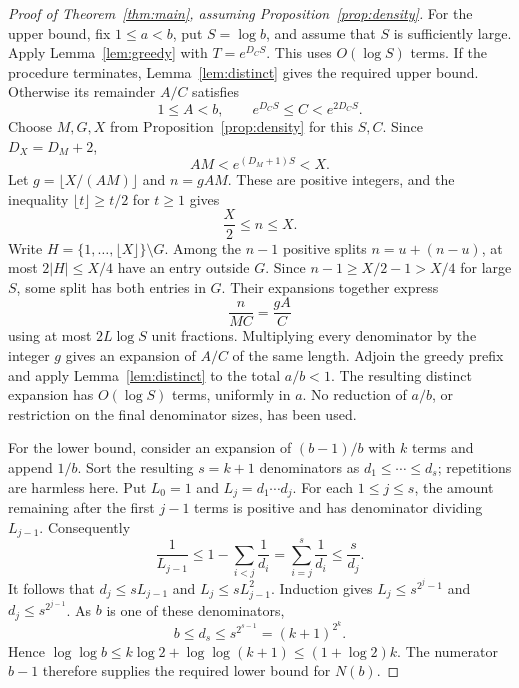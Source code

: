 \begin{proof}[Proof of Theorem~\ref{thm:main}, assuming
Proposition~\ref{prop:density}]
For the upper bound, fix \(1\le a<b\), put \(S=\log b\), and assume that
\(S\) is sufficiently large.  Apply Lemma~\ref{lem:greedy} with
\(T=e^{D_CS}\).  This uses \(O(\log S)\) terms.  If the procedure
terminates, Lemma~\ref{lem:distinct} gives the required upper bound.
Otherwise its
remainder \(A/C\) satisfies
\[
 1\le A<b,\qquad e^{D_CS}\le C<e^{2D_CS}.
\]
Choose \(M,G,X\) from Proposition~\ref{prop:density} for this \(S,C\).
Since \(D_X=D_M+2\),
\[
 AM<e^{(D_M+1)S}<X.
\]
Let \(g=\lfloor X/(AM)\rfloor\) and \(n=gAM\).  These are positive
integers, and the inequality \(\lfloor t\rfloor\ge t/2\) for \(t\ge1\)
gives
\[
 \frac X2\le n\le X.
\]
Write \(H=\{1,\ldots,\lfloor X\rfloor\}\setminus G\).
Among the \(n-1\) positive splits \(n=u+(n-u)\), at most \(2|H|\le X/4\)
have an entry outside \(G\).  Since \(n-1\ge X/2-1>X/4\) for large \(S\),
some split has both entries in \(G\).
Their expansions together express
\[
 \frac{n}{MC}=\frac{gA}{C}
\]
using at most \(2L\log S\) unit fractions.  Multiplying every denominator
by the integer \(g\) gives an expansion of \(A/C\) of the same length.
Adjoin the greedy prefix and apply Lemma~\ref{lem:distinct} to the total
\(a/b<1\).  The resulting distinct expansion has \(O(\log S)\) terms,
uniformly in \(a\).  No reduction of \(a/b\), or restriction on the final
denominator sizes, has been used.

For the lower bound, consider an expansion of \((b-1)/b\) with \(k\)
terms and append \(1/b\).  Sort the resulting \(s=k+1\) denominators as
\(d_1\le\cdots\le d_s\); repetitions are harmless here.
Put \(L_0=1\) and \(L_j=d_1\cdots d_j\).
For each \(1\le j\le s\), the amount remaining after the first \(j-1\)
terms is positive and has denominator dividing \(L_{j-1}\).
Consequently
\[
 \frac1{L_{j-1}}
 \le 1-\sum_{i<j}\frac1{d_i}
 =\sum_{i=j}^s\frac1{d_i}
 \le\frac{s}{d_j}.
\]
It follows that \(d_j\le sL_{j-1}\) and \(L_j\le sL_{j-1}^2\).
Induction gives \(L_j\le s^{2^j-1}\) and \(d_j\le s^{2^{j-1}}\).
As \(b\) is one of these denominators,
\[
 b\le d_s\le s^{2^{s-1}}=(k+1)^{2^k}.
\]
Hence
\(\log\log b\le k\log2+\log\log(k+1)\le(1+\log2)k\).
The numerator \(b-1\) therefore supplies the required lower bound for
\(N(b)\).
\end{proof}

